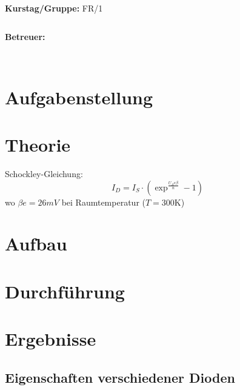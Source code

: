 \documentclass[12pt,a4paper,twopage]{article}
\begin{document}
\begin{verbatim}


\end{verbatim}
			\begin{flushleft}
			\textbf{\Large{Kurstag/Gruppe:}} \Large{FR/1}
			\end{flushleft}

\begin{verbatim}

\end{verbatim}
			\begin{flushleft}
			\LARGE{\textbf{Betreuer:\Large{}}}		
			\end{flushleft}
\newpage
\begin{verbatim}


\end{verbatim}
			
\section{Aufgabenstellung}
\section{Theorie}
Schockley-Gleichung:
\begin{equation}
I_D=I_S\cdot\left(\exp^{\frac{U_A e \beta}{n}}-1\right)
\label{shockley}
\end{equation}
wo $\beta e=26\si{mV}$ bei Raumtemperatur ($T=300$K)
\subsection{}
\section{Aufbau}
\section{Durchführung}
\section{Ergebnisse}
\subsection{Eigenschaften verschiedener Dioden}
\end{document}
